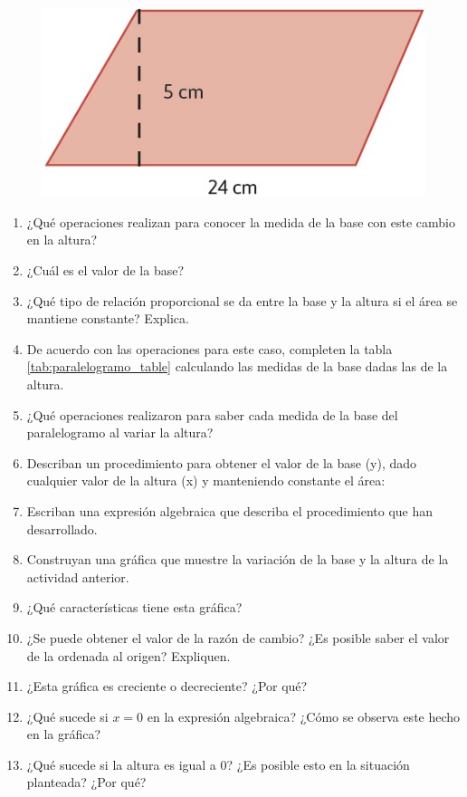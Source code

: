 \documentclass[11pt]{book}
\begin{document}
\begin{enumerate}
\begin{minipage}[t]{0.35\linewidth}
\begin{figure}[H]
          \end{figure}
        \end{minipage}\hfill
        \begin{minipage}[t]{0.65\linewidth}
          \begin{figure}[H]
            \centering
            \includegraphics[width=0.7\linewidth]{paralelogramo.jpg}
            \label{fig:paralelogramo_fig}
          \end{figure}
          \begin{enumerate}
            \item ¿Qué operaciones realizan para conocer la medida de la base con este cambio en la altura?
            \item ¿Cuál es el valor de la base?
            \item ¿Qué tipo de relación proporcional se da entre la base y la altura si el área se mantiene constante? Explica.
            \item De acuerdo con las operaciones para este caso, completen la tabla \ref{tab:paralelogramo_table} calculando las medidas de la base
                  dadas las de la altura.
            \item ¿Qué operaciones realizaron para saber cada medida de la base del paralelogramo al variar la altura?
            \item Describan un procedimiento para obtener el valor de la base (y), dado cualquier valor de la altura (x)
                  y manteniendo constante el área:
            \item Escriban una expresión algebraica que describa el procedimiento que han desarrollado.
            \item Construyan una gráfica que muestre la variación de la base y la altura de la actividad anterior.
            \item ¿Qué características tiene esta gráfica?
            \item ¿Se puede obtener el valor de la razón de cambio? ¿Es posible saber el valor de la ordenada al origen? Expliquen.
            \item ¿Esta gráfica es creciente o decreciente? ¿Por qué?
            \item ¿Qué sucede si $x = 0$ en la expresión algebraica? ¿Cómo se observa este hecho en la gráfica?
            \item ¿Qué sucede si la altura es igual a 0? ¿Es posible esto en la situación planteada? ¿Por qué?
          \end{enumerate}
        \end{minipage}
\end{enumerate}
\newpage
\end{document}
